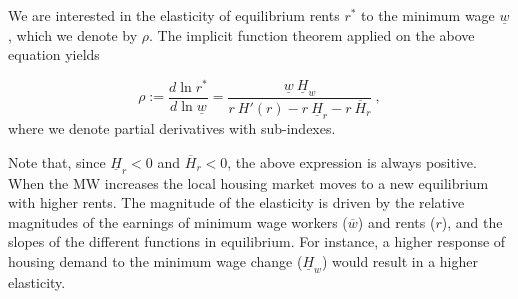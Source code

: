 We are interested in the elasticity of equilibrium rents $r^*$ to the minimum wage $\underline{w}$, 
which we denote by $\rho$. The implicit function theorem applied on the above equation yields

\begin{equation}\label{eq:model-elasticity}
\rho := \frac{d \ln r^*}{d \ln \underline{w}} 
= \frac{\underline{w} \ \underline{H}_w}
{r\  H'(r) - r \ \underline{H}_r - r \ \overline{H}_r} \ ,
\end{equation}
where we denote partial derivatives with sub-indexes.

Note that, since $\underline{H}_r < 0$ and $\overline{H}_r < 0$, the above expression is always 
positive. When the MW increases the local housing market moves to a new equilibrium with higher 
rents. The magnitude of the elasticity is driven by the relative magnitudes of the earnings of 
minimum wage workers ($\overline{w}$) and rents ($r$), and the slopes of the different 
functions in equilibrium. For instance, a higher response of housing demand to the minimum wage 
change ($\underline{H}_w$) would result in a higher elasticity.